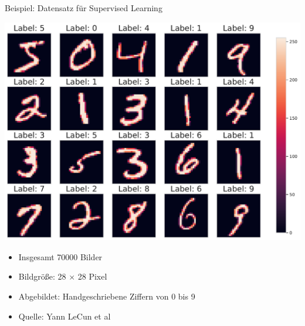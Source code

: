 \documentclass[aspectratio=169, 10pt]{beamer}
\begin{document}
\begin{frame}{Beispiel: Datensatz für Supervised Learning}
  \begin{minipage}{.6\textwidth}
    \centering
    \includegraphics[width=\textwidth]{mnist}
  \end{minipage}\hfill%
  \begin{minipage}{.4\textwidth}
    \begin{itemize}
    \item Insgesamt 70000 Bilder
    \item Bildgröße: 28 \(\times\) 28 Pixel
    \item Abgebildet: Handgeschriebene Ziffern von 0 bis 9
    \item Quelle: Yann LeCun et al \parencite{lecun1998gradient}
    \end{itemize}
  \end{minipage}
\end{frame}
\end{document}
